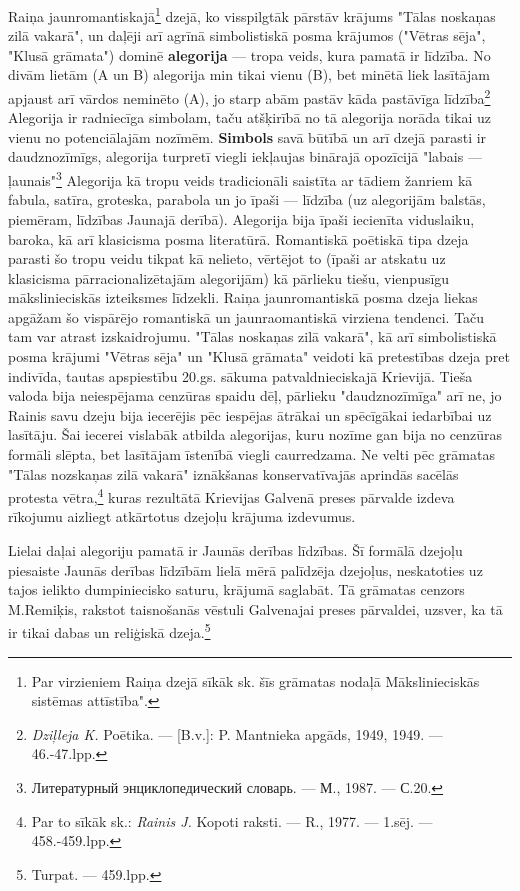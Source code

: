 \documentclass[11pt]{article}
\begin{document}
Raiņa jaunromantiskajā\footnote{Par virzieniem
Raiņa dzejā sīkāk sk. šīs grāmatas nodaļā
Mākslinieciskās sistēmas attīstība".} dzejā,
ko visspilgtāk pārstāv krājums "Tālas noskaņas
zilā vakarā", un daļēji arī agrīnā simbolistiskā
posma krājumos ("Vētras sēja", "Klusā grāmata")
dominē {\bf alegorija} --- tropa veids, kura pamatā
ir līdzība. No divām lietām (A un B) alegorija
min tikai vienu (B), bet minētā liek lasītājam
apjaust arī vārdos neminēto (A), jo
starp abām pastāv kāda pastāvīga
līdzība\footnote{{\em Dziļleja K.} Poētika. ---
[B.v.]: P. Mantnieka apgāds, 1949, 1949. ---
46.-47.lpp.} Alegorija ir radniecīga simbolam,
taču atšķirībā no tā alegorija norāda tikai uz vienu
no potenciālajām nozīmēm. {\bf Simbols}
savā būtībā un arī dzejā parasti ir daudznozīmīgs,
alegorija turpretī viegli iekļaujas binārajā opozīcijā
"labais --- ļaunais"\footnote{Литературный
энциклопедический словарь. --- М., 1987. ---
С.20.}  Alegorija kā tropu veids tradicionāli
saistīta ar tādiem žanriem kā fabula, satīra,
groteska, parabola un jo īpaši --- līdzība
(uz alegorijām balstās, piemēram, līdzības Jaunajā derībā).
Alegorija bija īpaši iecienīta viduslaiku, baroka,
kā arī klasicisma posma literatūrā.
Romantiskā poētiskā tipa dzeja parasti šo tropu
veidu tikpat kā nelieto, vērtējot to (īpaši ar atskatu
uz klasicisma pārracionalizētajām alegorijām) kā pārlieku
tiešu, vienpusīgu mākslinieciskās izteiksmes līdzekli.
Raiņa jaunromantiskā posma dzeja liekas apgāžam
šo vispārējo romantiskā un jaunraomantiskā virziena
tendenci. Taču tam var atrast izskaidrojumu.
"Tālas noskaņas zilā vakarā", kā arī simbolistiskā
posma krājumi "Vētras sēja" un "Klusā grāmata" veidoti
kā pretestības dzeja pret indivīda, tautas apspiestību
20.gs. sākuma patvaldnieciskajā Krievijā. Tieša valoda
bija neiespējama cenzūras spaidu dēļ, pārlieku
"daudznozīmīga" arī ne, jo Rainis savu
dzeju bija iecerējis pēc iespējas ātrākai un spēcīgākai
iedarbībai uz lasītāju. Šai iecerei vislabāk atbilda
alegorijas, kuru nozīme gan bija no cenzūras formāli slēpta, bet
lasītājam īstenībā viegli caurredzama. Ne velti pēc
grāmatas "Tālas nozskaņas zilā vakarā" iznākšanas
konservatīvajās aprindās sacēlās protesta vētra,\footnote{Par
to sīkāk sk.: {\em Rainis J.} Kopoti raksti. --- R., 1977. ---
1.sēj. --- 458.-459.lpp.} kuras rezultātā
Krievijas Galvenā preses pārvalde izdeva rīkojumu
aizliegt atkārtotus dzejoļu krājuma izdevumus.

Lielai daļai alegoriju pamatā ir Jaunās derības līdzības.
Šī formālā dzejoļu piesaiste Jaunās derības līdzībām
lielā mērā palīdzēja dzejoļus, neskatoties uz tajos
ielikto dumpiniecisko saturu, krājumā saglabāt. Tā grāmatas
cenzors M.Remiķis, rakstot taisnošanās vēstuli
Galvenajai preses pārvaldei, uzsver, ka tā ir tikai
dabas un reliģiskā dzeja.\footnote{Turpat. --- 459.lpp.}
\end{document}
